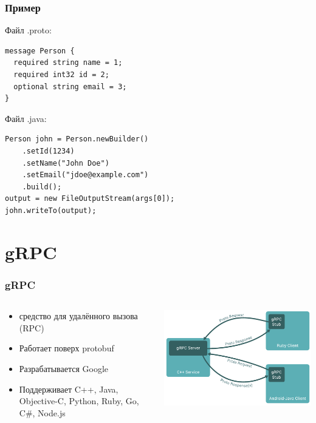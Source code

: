\documentclass[xetex,mathserif,serif]{beamer}
\begin{document}
	\begin{frame}[fragile]
		\frametitle{Пример}
		Файл .proto:
		\begin{verbatim}
message Person {
  required string name = 1;
  required int32 id = 2;
  optional string email = 3;
}
		\end{verbatim}
		\vspace{2mm}
		Файл .java:
		\begin{verbatim}
Person john = Person.newBuilder()
    .setId(1234)
    .setName("John Doe")
    .setEmail("jdoe@example.com")
    .build();
output = new FileOutputStream(args[0]);
john.writeTo(output);
		\end{verbatim}
	\end{frame}

	\section{gRPC}

	\begin{frame}
		\frametitle{gRPC}
		\begin{columns}
			\begin{column}{0.6\textwidth}
				\begin{itemize}
					\item средство для удалённого вызова (RPC)
					\item Работает поверх protobuf
					\item Разрабатывается Google
					\item Поддерживает C++, Java, Objective-C, Python, Ruby, Go, C\#, Node.js
				\end{itemize}
			\end{column}
			\begin{column}{0.4\textwidth}
				\begin{center}
					\includegraphics[width=\textwidth]{grpc.png}
				\end{center}
			\end{column}
		\end{columns}
	\end{frame}
\end{document}
